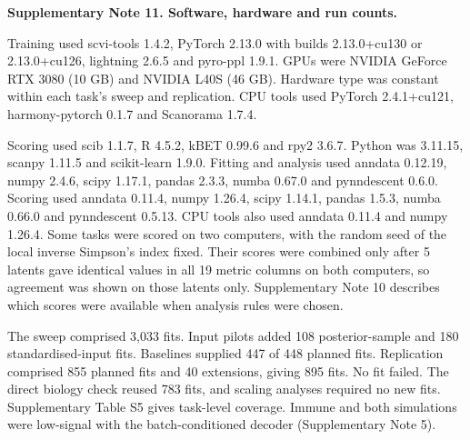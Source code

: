 \medskip\noindent\textbf{Supplementary Note 11. Software, hardware and run counts.}\par\smallskip
\begingroup\small\setlength{\parskip}{3pt}
Training used scvi-tools 1.4.2, PyTorch 2.13.0 with builds 2.13.0+cu130 or 2.13.0+cu126, lightning 2.6.5 and pyro-ppl 1.9.1. GPUs were NVIDIA GeForce RTX 3080 (10 GB) and NVIDIA L40S (46 GB). Hardware type was constant within each task's sweep and replication. CPU tools used PyTorch 2.4.1+cu121, harmony-pytorch 0.1.7 and Scanorama 1.7.4.

Scoring used scib 1.1.7, R 4.5.2, kBET 0.99.6 and rpy2 3.6.7. Python was 3.11.15, scanpy 1.11.5 and scikit-learn 1.9.0. Fitting and analysis used anndata 0.12.19, numpy 2.4.6, scipy 1.17.1, pandas 2.3.3, numba 0.67.0 and pynndescent 0.6.0. Scoring used anndata 0.11.4, numpy 1.26.4, scipy 1.14.1, pandas 1.5.3, numba 0.66.0 and pynndescent 0.5.13. CPU tools also used anndata 0.11.4 and numpy 1.26.4. Some tasks were scored on two computers, with the random seed of the local inverse Simpson's index fixed. Their scores were combined only after 5 latents gave identical values in all 19 metric columns on both computers, so agreement was shown on those latents only. Supplementary Note 10 describes which scores were available when analysis rules were chosen.

The sweep comprised 3,033 fits. Input pilots added 108 posterior-sample and 180 standardised-input fits. Baselines supplied 447 of 448 planned fits. Replication comprised 855 planned fits and 40 extensions, giving 895 fits. No fit failed. The direct biology check reused 783 fits, and scaling analyses required no new fits. Supplementary Table S5 gives task-level coverage. Immune and both simulations were low-signal with the batch-conditioned decoder (Supplementary Note 5).
\par\endgroup
